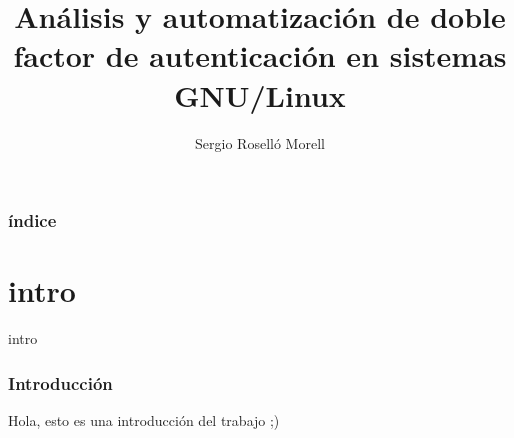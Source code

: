 \documentclass{beamer}
\title{Análisis y automatización de doble factor de autenticación en sistemas GNU/Linux}
\author{Sergio Roselló Morell}
\begin{document}
\frame{\titlepage}

\begin{frame}
\frametitle{índice}
\tableofcontents
\end{frame}
\section{intro}
\begin{frame}{intro}
\frametitle{Introducción}
Hola, esto es una introducción del trabajo ;)
\end{frame}
\end{document}
